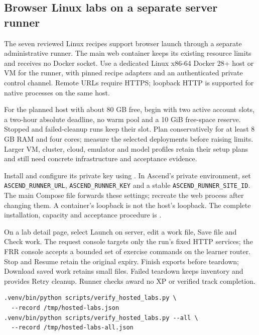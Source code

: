 \subsection{Browser Linux labs on a separate server runner}
The seven reviewed Linux recipes support browser launch through a separate
administrative runner. The main web container keeps its existing resource limits
and receives no Docker socket. Use a dedicated Linux x86-64 Docker 28+ host or VM
for the runner, with pinned recipe adapters and an authenticated private control
channel. Remote URLs require HTTPS; loopback HTTP is supported for native
processes on the same host.

For the planned host with about 80 GB free, begin with two active account slots,
a two-hour absolute deadline, no warm pool and a 10 GiB free-space reserve.
Stopped and failed-cleanup runs keep their slot. Plan conservatively for at least
8 GB RAM and four cores; measure the selected deployments before raising limits.
Larger VM, cluster, cloud, emulator and model profiles retain their setup plans
and still need concrete infrastructure and acceptance evidence.

Install  and configure its private key
using . In Ascend's private environment, set
\texttt{ASCEND\_RUNNER\_URL}, \texttt{ASCEND\_RUNNER\_KEY} and a stable
\texttt{ASCEND\_RUNNER\_SITE\_ID}. The main Compose file forwards these settings;
recreate the web process after changing them. A container's loopback is not the
host's loopback. The complete installation, capacity and acceptance procedure is
.

On a lab detail page, select Launch on server, edit a work file, Save file and
Check work. The request console targets only the run's fixed HTTP services;
the FRR console accepts a bounded set of exercise commands on the learner router.
Stop and Resume retain the original expiry. Finish exports before teardown;
Download saved work retains small files. Failed teardown keeps inventory and
provides Retry cleanup. Runner checks award no XP or verified track completion.

\begin{verbatim}
.venv/bin/python scripts/verify_hosted_labs.py \
  --record /tmp/hosted-labs.json
.venv/bin/python scripts/verify_hosted_labs.py --all \
  --record /tmp/hosted-labs-all.json
\end{verbatim}
